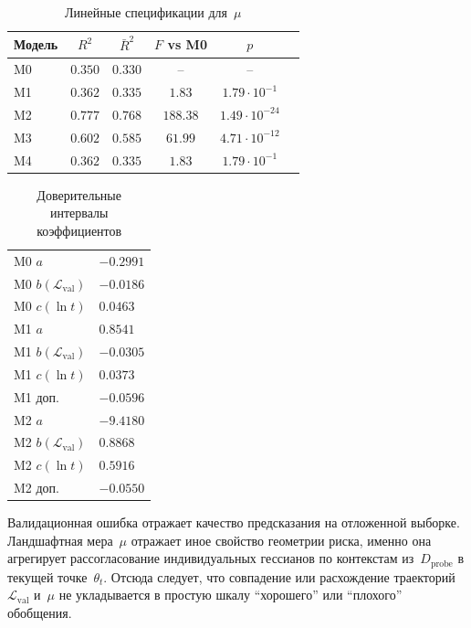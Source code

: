 \documentclass[11pt]{ubs}
\begin{document}
\begin{table}[htbp]
\centering
\caption{Линейные спецификации для~$\mu$}
\label{tab:reg-summary}
\footnotesize
\setlength{\tabcolsep}{3pt}
\begin{tabularx}{\linewidth}{|l|c|c|c|c|>{\raggedright\arraybackslash}X|}
\hline
Модель & $R^2$ & $\bar R^2$ & $F$ vs M0 & $p$ \\
\hline
M0 & $0.350$ & $0.330$ & -- & -- \\
M1 & $0.362$ & $0.335$ & $1.83$ & $1.79\cdot 10^{-1}$ \\
M2 & $0.777$ & $0.768$ & $188.38$ & $1.49\cdot 10^{-24}$ \\
M3 & $0.602$ & $0.585$ & $61.99$ & $4.71\cdot 10^{-12}$ \\
M4 & $0.362$ & $0.335$ & $1.83$ & $1.79\cdot 10^{-1}$ \\
\hline
\end{tabularx}
\end{table}

\begin{table}[htbp]
\centering
\caption{Доверительные интервалы коэффициентов}
\label{tab:reg-coefs}
\footnotesize
\setlength{\tabcolsep}{4pt}
\begin{tabularx}{\linewidth}{|>{\raggedright\arraybackslash}p{2.75cm}|>{\raggedright\arraybackslash}X|}
\hline
M0 $a$ & $-0.2991$ \; [$-1.6756,\;0.8722$] \\
M0 $b(\mathcal{L}_{\mathrm{val}})$ & $-0.0186$ \; [$-0.0698,\;0.0451$] \\
M0 $c(\ln t)$ & $0.0463$ \; [$-0.0037,\;0.1083$] \\
\hline
M1 $a$ & $0.8541$ \; [$-0.7184,\;2.3416$] \\
M1 $b(\mathcal{L}_{\mathrm{val}})$ & $-0.0305$ \; [$-0.0774,\;0.0294$] \\
M1 $c(\ln t)$ & $0.0373$ \; [$-0.0071,\;0.0895$] \\
M1 доп. & $-0.0596$ \; [$-0.1500,\;0.0242$] \\
\hline
M2 $a$ & $-9.4180$ \; [$-12.1149,\;-6.9555$] \\
M2 $b(\mathcal{L}_{\mathrm{val}})$ & $0.8868$ \; [$0.6819,\;1.1191$] \\
M2 $c(\ln t)$ & $0.5916$ \; [$0.4503,\;0.7454$] \\
M2 доп. & $-0.0550$ \; [$-0.0684,\;-0.0438$] \\
\hline
\end{tabularx}
\end{table}

Валидационная ошибка отражает качество предсказания на отложенной выборке.
Ландшафтная мера~$\mu$ отражает иное свойство геометрии риска, именно она агрегирует рассогласование индивидуальных гессианов по контекстам из~$D_{\mathrm{probe}}$ в текущей точке~$\theta_t$.
Отсюда следует, что совпадение или расхождение траекторий~$\mathcal{L}_{\mathrm{val}}$ и~$\mu$ не укладывается в простую шкалу ``хорошего'' или ``плохого'' обобщения.
\end{document}
